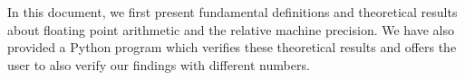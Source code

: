 In this document, we first present fundamental definitions and theoretical results about floating point arithmetic and the relative machine precision. We have also provided a Python program which verifies these theoretical results and offers the user to also verify our findings with different numbers.